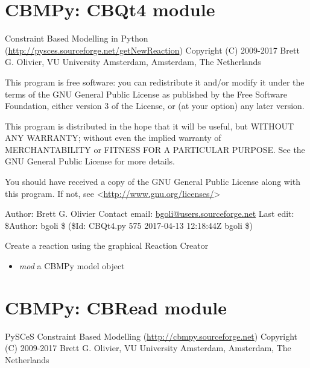 \documentclass[a4paper,11pt,english]{sphinxmanual}
\begin{document}
\label{modules_doc:module-cbmpy.CBQt4}

\section{CBMPy: CBQt4 module}
\label{modules_doc:cbmpy-cbqt4-module}
Constraint Based Modelling in Python (\url{http://pysces.sourceforge.net/getNewReaction})
Copyright (C) 2009-2017 Brett G. Olivier, VU University Amsterdam, Amsterdam, The Netherlands

This program is free software: you can redistribute it and/or modify
it under the terms of the GNU General Public License as published by
the Free Software Foundation, either version 3 of the License, or
(at your option) any later version.

This program is distributed in the hope that it will be useful,
but WITHOUT ANY WARRANTY; without even the implied warranty of
MERCHANTABILITY or FITNESS FOR A PARTICULAR PURPOSE.  See the
GNU General Public License for more details.

You should have received a copy of the GNU General Public License
along with this program.  If not, see \textless{}\url{http://www.gnu.org/licenses/}\textgreater{}

Author: Brett G. Olivier
Contact email: \href{mailto:bgoli@users.sourceforge.net}{bgoli@users.sourceforge.net}
Last edit: \$Author: bgoli \$ (\$Id: CBQt4.py 575 2017-04-13 12:18:44Z bgoli \$)

\begin{fulllineitems}
\label{modules_doc:cbmpy.CBQt4.createReaction}
Create a reaction using the graphical Reaction Creator
\begin{itemize}
\item {} 
\emph{mod} a CBMPy model object

\end{itemize}

\end{fulllineitems}

\label{modules_doc:module-cbmpy.CBRead}

\section{CBMPy: CBRead module}
\label{modules_doc:cbmpy-cbread-module}
PySCeS Constraint Based Modelling (\url{http://cbmpy.sourceforge.net})
Copyright (C) 2009-2017 Brett G. Olivier, VU University Amsterdam, Amsterdam, The Netherlands
\end{document}
